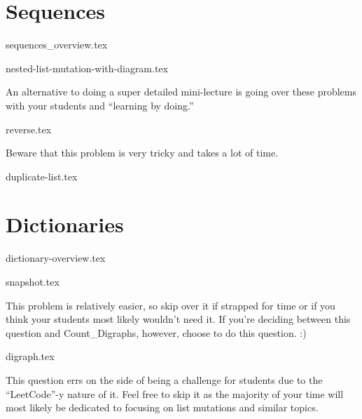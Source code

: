 \documentclass{exam}
\begin{document}
\section{Sequences}
{sequences_overview.tex}
\begin{questions}
    {nested-list-mutation-with-diagram.tex}
    \begin{questionmeta}
        An alternative to doing a super detailed mini-lecture is going over these problems with your students and ``learning by doing.'' 
    \end{questionmeta}
    {reverse.tex}
    \begin{questionmeta}
        Beware that this problem is very tricky and takes a lot of time.
    \end{questionmeta}
    {duplicate-list.tex}
    \vspace{3in}
\end{questions}

\section{Dictionaries}
{dictionary-overview.tex}
\begin{questions}
    {snapshot.tex}
    \begin{questionmeta}
        This problem is relatively easier, so skip over it if strapped for time or if you think your students most likely wouldn't need it. 
        If you're deciding between this question and Count\_Digraphs, however, choose to do this question. :)
    \end{questionmeta}
    {digraph.tex}
    \begin{questionmeta}
        This question errs on the side of being a challenge for students due to the ``LeetCode''-y nature of it. Feel free to skip it as the majority of your time will most likely be dedicated to focusing on list mutations and similar topics.
    \end{questionmeta}
\end{questions}
\end{document}
